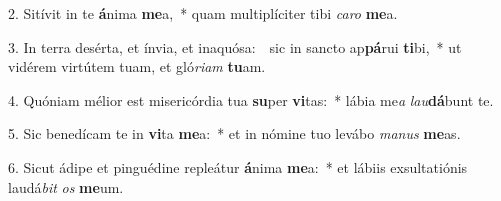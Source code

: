 
2. Sitívit in te \textbf{á}nima \textbf{me}a,~* quam multiplíciter tibi \textit{ca}\textit{ro} \textbf{me}a.

3. In terra desérta, et ínvia, et inaquósa:~\GreDagger\ sic in sancto ap\textbf{pá}rui \textbf{ti}bi,~* ut vidérem virtútem tuam, et gló\textit{ri}\textit{am} \textbf{tu}am.

4. Quóniam mélior est misericórdia tua \textbf{su}per \textbf{vi}tas:~* lábia me\textit{a} \textit{lau}\textbf{dá}bunt te.

5. Sic benedícam te in \textbf{vi}ta \textbf{me}a:~* et in nómine tuo levábo \textit{ma}\textit{nus} \textbf{me}as.

6. Sicut ádipe et pinguédine repleátur \textbf{á}nima \textbf{me}a:~* et lábiis exsultatiónis laudá\textit{bit} \textit{os} \textbf{me}um.


